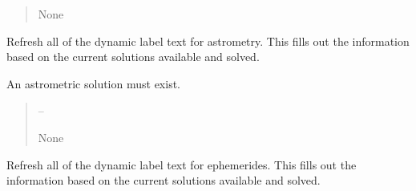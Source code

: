 \documentclass[letterpaper,11pt,english]{sphinxmanual}
\begin{document}
\begin{savenotes}
\begin{fulllineitems}
\begin{savenotes}
\begin{fulllineitems}
\begin{quote}
\begin{description}
\sphinxAtStartPar
None

\end{description}\end{quote}

\end{fulllineitems}\end{savenotes}


\begin{savenotes}\begin{fulllineitems}
\label{\detokenize{code/opihiexarata.gui.manual:opihiexarata.gui.manual.OpihiManualWindow.__refresh_dynamic_label_text_astrometry}}
\pysigstartsignatures
{}
\pysigstopsignatures
\sphinxAtStartPar
Refresh all of the dynamic label text for astrometry.
This fills out the information based on the current solutions
available and solved.

\sphinxAtStartPar
An astrometric solution must exist.
\begin{quote}\begin{description}
\sphinxAtStartPar
{} – 

\sphinxAtStartPar
None

\end{description}\end{quote}

\end{fulllineitems}\end{savenotes}


\begin{savenotes}\begin{fulllineitems}
\label{\detokenize{code/opihiexarata.gui.manual:opihiexarata.gui.manual.OpihiManualWindow.__refresh_dynamic_label_text_ephemeris}}
\pysigstartsignatures
{}
\pysigstopsignatures
\sphinxAtStartPar
Refresh all of the dynamic label text for ephemerides.
This fills out the information based on the current solutions
available and solved.


\end{fulllineitems}
\end{savenotes}
\end{fulllineitems}
\end{savenotes}
\end{document}
